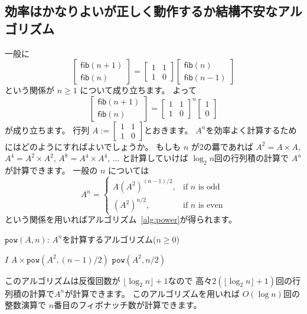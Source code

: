 \documentclass[a4paper,twoside,onecolumn,openany,article]{memoir}
\theoremstyle{plain}
\theoremstyle{remark}
\begin{document}
\subsection{効率はかなりよいが正しく動作するか結構不安なアルゴリズム}\label{sec:matrix}
一般に
\begin{equation*}
\begin{bmatrix}
\mathsf{fib}(n+1)\\
\mathsf{fib}(n)
\end{bmatrix}
=
\begin{bmatrix}
1&1\\
1&0
\end{bmatrix}
\begin{bmatrix}
\mathsf{fib}(n)\\
\mathsf{fib}(n-1)
\end{bmatrix}
\end{equation*}
という関係が $n\ge 1$ について成り立ちます。
よって
\begin{equation*}
\begin{bmatrix}
\mathsf{fib}(n+1)\\
\mathsf{fib}(n)
\end{bmatrix}
=
\begin{bmatrix}
1&1\\
1&0
\end{bmatrix}^n
\begin{bmatrix}
1\\0
\end{bmatrix}
\end{equation*}
が成り立ちます。
行列 $A:=
\begin{bmatrix}
1&1\\
1&0
\end{bmatrix}$とおきます。
$A^n$を効率よく計算するためにはどのようにすればよいでしょうか。
もしも $n$ が2の羃であれば $A^2 = A\times A$, $A^4= A^2 \times A^2$, $A^8 = A^4\times A^4$, $\dotsc$
と計算していけば $\log_2 n$回の行列積の計算で $A^n$ が計算できます。
一般の $n$ については
\begin{equation*}
A^n = \begin{cases}
A (A^2)^{(n-1)/2},& \text{if $n$ is odd}\\
(A^2)^{n/2},& \text{if $n$ is even}
\end{cases}
\end{equation*}
という関係を用いればアルゴリズム~\ref{alg:power}が得られます。
%
\begin{algorithm}[H]
\caption{$\mathtt{pow}(A,n)$: $A^n$を計算するアルゴリズム($n\ge 0$)}
\label{alg:power}
\begin{algorithmic}
  \State \Return $I$
  \State \Return $A\times\mathtt{pow}(A^2, (n-1)/2)$
\Else
  \State \Return $\mathtt{pow}(A^2, n/2)$
\EndIf
\end{algorithmic}
\end{algorithm}
%
このアルゴリズムは反復回数が $\lfloor \log_2 n\rfloor+1$なので
高々$2(\lfloor \log_2 n\rfloor+1)$回の行列積の計算で$A^n$が計算できます。
このアルゴリズムを用いれば $O(\log n)$回の整数演算で $n$番目のフィボナッチ数が計算できます。
\end{document}
